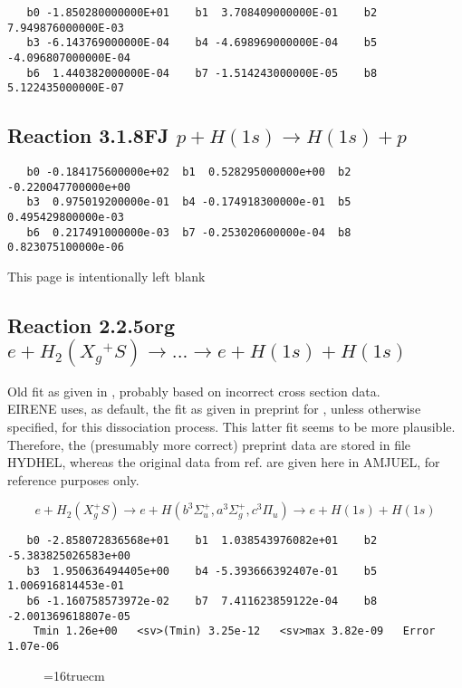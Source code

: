\documentclass[12pt,dvipdfmx]{article}
\begin{document}
\begin{small}\begin{verbatim}
   b0 -1.850280000000E+01    b1  3.708409000000E-01    b2  7.949876000000E-03
   b3 -6.143769000000E-04    b4 -4.698969000000E-04    b5 -4.096807000000E-04
   b6  1.440382000000E-04    b7 -1.514243000000E-05    b8  5.122435000000E-07
\end{verbatim}\end{small}

\subsection{
Reaction 3.1.8FJ  $p + H(1s) \rightarrow H(1s) + p  $
}


\begin{small}\begin{verbatim}
   b0 -0.184175600000e+02  b1  0.528295000000e+00  b2 -0.220047700000e+00
   b3  0.975019200000e-01  b4 -0.174918300000e-01  b5  0.495429800000e-03
   b6  0.217491000000e-03  b7 -0.253020600000e-04  b8  0.823075100000e-06
\end{verbatim}\end{small}

\newpage
This page is intentionally left blank
\newpage


\subsection{
Reaction 2.2.5org
$e + H_2(X_g\!^+ S ) \rightarrow . . .\rightarrow e + H(1s) + H(1s)$}


Old fit as given in \cite{kn:Janev}, probably based on incorrect cross section data.\\
      EIRENE uses, as default, the fit as given in preprint for \cite{kn:Janev},
      unless otherwise specified, for this dissociation process.
      This latter fit seems to be more plausible. Therefore, the
      (presumably more correct) preprint data are stored in file HYDHEL,
      whereas the original data from ref.\cite{kn:Janev} are given here in AMJUEL,
      for reference purposes only.



\begin{displaymath}
 e + H_2(X_g^+ S) \rightarrow e + H(b^3\Sigma^+_u , a^3\Sigma^+_g,
c^3\Pi_u)
             \rightarrow e + H(1s) + H(1s)
\end{displaymath}



\begin{small}\begin{verbatim}
   b0 -2.858072836568e+01    b1  1.038543976082e+01    b2 -5.383825026583e+00
   b3  1.950636494405e+00    b4 -5.393666392407e-01    b5  1.006916814453e-01
   b6 -1.160758573972e-02    b7  7.411623859122e-04    b8 -2.001369618807e-05
    Tmin 1.26e+00   <sv>(Tmin) 3.25e-12   <sv>max 3.82e-09   Error 1.07e-06
\end{verbatim}\end{small}
\begin{figure} \label{2.2.5.or}
\epsfxsize=16truecm
\end{figure}
\end{document}
